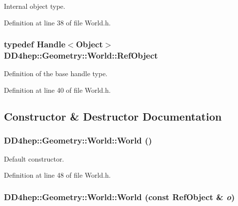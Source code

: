 Internal object type. 

Definition at line 38 of file World.h.\hypertarget{class_d_d4hep_1_1_geometry_1_1_world_a796916c7109e45753547adc18d85aa7f}{
\subsubsection[{RefObject}]{\setlength{\rightskip}{0pt plus 5cm}typedef {\bf Handle}$<${\bf Object}$>$ {\bf DD4hep::Geometry::World::RefObject}}}
\label{class_d_d4hep_1_1_geometry_1_1_world_a796916c7109e45753547adc18d85aa7f}


Definition of the base handle type. 

Definition at line 40 of file World.h.

\subsection{Constructor \& Destructor Documentation}
\hypertarget{class_d_d4hep_1_1_geometry_1_1_world_a0de7a5ff6ecdfc4ac5fc3b05585eef32}{
\subsubsection[{World}]{\setlength{\rightskip}{0pt plus 5cm}DD4hep::Geometry::World::World ()}}
\label{class_d_d4hep_1_1_geometry_1_1_world_a0de7a5ff6ecdfc4ac5fc3b05585eef32}


Default constructor. 

Definition at line 48 of file World.h.\hypertarget{class_d_d4hep_1_1_geometry_1_1_world_ab51a5950dc7bf892672b90fb6e7c3c1f}{
\subsubsection[{World}]{\setlength{\rightskip}{0pt plus 5cm}DD4hep::Geometry::World::World (const {\bf RefObject} \& {\em o})}}
\label{class_d_d4hep_1_1_geometry_1_1_world_ab51a5950dc7bf892672b90fb6e7c3c1f}


